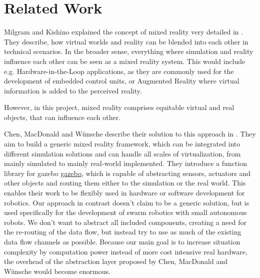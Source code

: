 \section{Related Work}
\label{sec:relWork}
Milgram and Kishino explained the concept  of mixed reality very detailed in \cite{milgram1994}.
They describe, how virtual worlds and reality can be blended into each other in technical scenarios.
In the broader sense, everything where simulation and reality influence each other can be seen as a mixed reality system.
This would include e.g. Hardware-in-the-Loop applications, as they are commonly used for the development of embedded control units, or Augmented Reality where virtual  information is added to the perceived reality.

However, in this project, mixed reality comprises equitable virtual and real objects, that can influence each other. 

Chen, MacDonald and Wünsche describe their solution to this approach in \cite{Chen2011}.
They aim to build a generic mixed reality framework, which can be integrated into different simulation solutions and can handle all scales of virtualization, from mainly simulated to mainly real-world implemented.
They introduce a function library for gazebo \href{http://gazebosim.org}{gazebo}, which is capable of abstracting sensors, actuators and other objects and routing them either to the simulation or the real world.
This enables their work to be flexibly used in hardware or software development for robotics. 
Our approach in contrast doesn't claim to be a generic solution, but is used specifically for the development of swarm robotics with small autonomous robots. 
We don't want to abstract all included components, creating a need for the re-routing of the data flow, but instead try to use as much of the existing data flow channels as possible.
Because our main goal is to increase situation complexity by computation power instead of more cost intensive real hardware, the overhead of the abstraction layer proposed by Chen, MacDonald and Wünsche would become enormous. 

